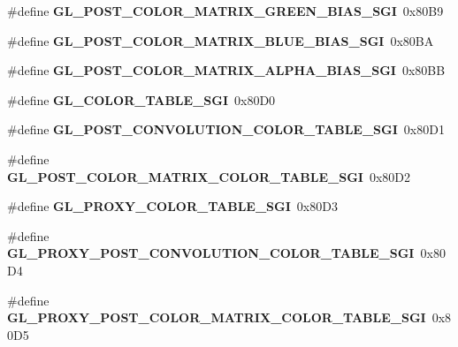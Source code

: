 \begin{DoxyCompactItemize}
\item 
\#define {\bfseries G\+L\+\_\+\+P\+O\+S\+T\+\_\+\+C\+O\+L\+O\+R\+\_\+\+M\+A\+T\+R\+I\+X\+\_\+\+G\+R\+E\+E\+N\+\_\+\+B\+I\+A\+S\+\_\+\+S\+G\+I}~0x80\+B9\label{_s_d_l__opengl_8h_aed98fc9f7e99f5aff56ad811d8107670}

\item 
\#define {\bfseries G\+L\+\_\+\+P\+O\+S\+T\+\_\+\+C\+O\+L\+O\+R\+\_\+\+M\+A\+T\+R\+I\+X\+\_\+\+B\+L\+U\+E\+\_\+\+B\+I\+A\+S\+\_\+\+S\+G\+I}~0x80\+B\+A\label{_s_d_l__opengl_8h_a68df29b6719cc192d565a8576b8d79c8}

\item 
\#define {\bfseries G\+L\+\_\+\+P\+O\+S\+T\+\_\+\+C\+O\+L\+O\+R\+\_\+\+M\+A\+T\+R\+I\+X\+\_\+\+A\+L\+P\+H\+A\+\_\+\+B\+I\+A\+S\+\_\+\+S\+G\+I}~0x80\+B\+B\label{_s_d_l__opengl_8h_a40f82bccf843c6dba584841780f2bb34}

\item 
\#define {\bfseries G\+L\+\_\+\+C\+O\+L\+O\+R\+\_\+\+T\+A\+B\+L\+E\+\_\+\+S\+G\+I}~0x80\+D0\label{_s_d_l__opengl_8h_ac61699d1c6a5a099915c412d0b58d3a7}

\item 
\#define {\bfseries G\+L\+\_\+\+P\+O\+S\+T\+\_\+\+C\+O\+N\+V\+O\+L\+U\+T\+I\+O\+N\+\_\+\+C\+O\+L\+O\+R\+\_\+\+T\+A\+B\+L\+E\+\_\+\+S\+G\+I}~0x80\+D1\label{_s_d_l__opengl_8h_a09b23236bbe6a3531ed284fdae19b5cd}

\item 
\#define {\bfseries G\+L\+\_\+\+P\+O\+S\+T\+\_\+\+C\+O\+L\+O\+R\+\_\+\+M\+A\+T\+R\+I\+X\+\_\+\+C\+O\+L\+O\+R\+\_\+\+T\+A\+B\+L\+E\+\_\+\+S\+G\+I}~0x80\+D2\label{_s_d_l__opengl_8h_a9e82e05b12f4729b49f58b1c7bee0bdb}

\item 
\#define {\bfseries G\+L\+\_\+\+P\+R\+O\+X\+Y\+\_\+\+C\+O\+L\+O\+R\+\_\+\+T\+A\+B\+L\+E\+\_\+\+S\+G\+I}~0x80\+D3\label{_s_d_l__opengl_8h_a80cf9963a640aeff648e78fd24d1b5c8}

\item 
\#define {\bfseries G\+L\+\_\+\+P\+R\+O\+X\+Y\+\_\+\+P\+O\+S\+T\+\_\+\+C\+O\+N\+V\+O\+L\+U\+T\+I\+O\+N\+\_\+\+C\+O\+L\+O\+R\+\_\+\+T\+A\+B\+L\+E\+\_\+\+S\+G\+I}~0x80\+D4\label{_s_d_l__opengl_8h_abe33d39da160e4e4b14dc6a25bc7f525}

\item 
\#define {\bfseries G\+L\+\_\+\+P\+R\+O\+X\+Y\+\_\+\+P\+O\+S\+T\+\_\+\+C\+O\+L\+O\+R\+\_\+\+M\+A\+T\+R\+I\+X\+\_\+\+C\+O\+L\+O\+R\+\_\+\+T\+A\+B\+L\+E\+\_\+\+S\+G\+I}~0x80\+D5\label{_s_d_l__opengl_8h_ac71cef47057695edf71a274ce1e7135f}


\end{DoxyCompactItemize}
